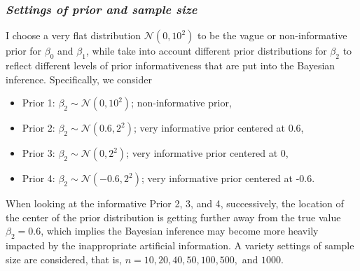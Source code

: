 \documentclass{article}
\numberwithin{equation}{section}
\theoremstyle{plain}
\begin{document}
\subsubsection*{\textit{Settings of prior and sample size}}
I choose a very flat distribution $\mathcal{N}(0, 10^2)$ to be the vague or non-informative prior for $\beta_0$ and $\beta_1$, while take into account different prior distributions for $\beta_2$ to reflect different levels of prior informativeness that are put into the Bayesian inference. Specifically, we consider
\begin{itemize}
    \item Prior 1: $\beta_2 \sim \mathcal{N}(0, 10^2)$; non-informative prior,
    \item Prior 2: $\beta_2 \sim \mathcal{N}(0.6, 2^2)$; very informative prior centered at 0.6,
    \item Prior 3: $\beta_2 \sim \mathcal{N}(0, 2^2)$; very informative prior centered at 0,
    \item Prior 4: $\beta_2 \sim \mathcal{N}(-0.6, 2^2)$; very informative prior centered at -0.6.
\end{itemize}
When looking at the informative Prior 2, 3, and 4, successively, the location of the center of the prior distribution is getting further away from the true value $\beta_2=0.6$, which implies the Bayesian inference may become more heavily impacted by the inappropriate artificial information. A variety settings of sample size are considered, that is, $n=10,20,40,50,100, 500,$ and $1000$. 
\end{document}
